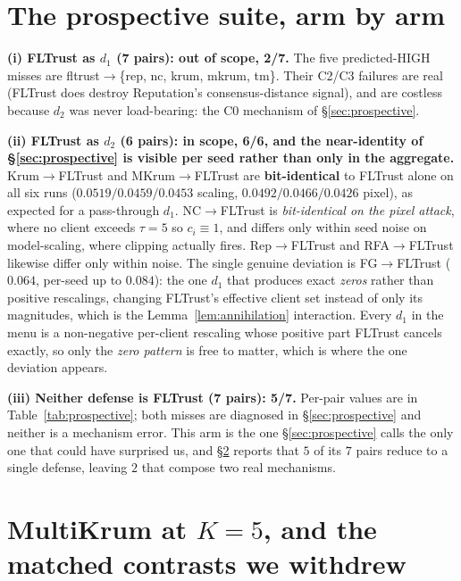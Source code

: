\documentclass{article}
\begin{document}
\small
\setlength{\tabcolsep}{4pt}

\section{The prospective suite, arm by arm}
\label{app:prospective_arms}

\textbf{(i) FLTrust as $d_1$ (7 pairs): out of scope, 2/7.} The five predicted-HIGH misses are fltrust$\to$\{rep, nc, krum, mkrum, tm\}. Their C2/C3 failures are real (FLTrust does destroy Reputation's consensus-distance signal), and are costless because $d_2$ was never load-bearing: the C0 mechanism of §\ref{sec:prospective}.

\textbf{(ii) FLTrust as $d_2$ (6 pairs): in scope, 6/6, and the near-identity of §\ref{sec:prospective} is visible per seed rather than only in the aggregate.} Krum$\to$FLTrust and MKrum$\to$FLTrust are \textbf{bit-identical} to FLTrust alone on all six runs ($0.0519/0.0459/0.0453$ scaling, $0.0492/0.0466/0.0426$ pixel), as expected for a pass-through $d_1$. NC$\to$FLTrust is \emph{bit-identical on the pixel attack}, where no client exceeds $\tau{=}5$ so $c_i \equiv 1$, and differs only within seed noise on model-scaling, where clipping actually fires. Rep$\to$FLTrust and RFA$\to$FLTrust likewise differ only within noise. The single genuine deviation is FG$\to$FLTrust ($0.064$, per-seed up to $0.084$): the one $d_1$ that produces exact \emph{zeros} rather than positive rescalings, changing FLTrust's effective client set instead of only its magnitudes, which is the Lemma~\ref{lem:annihilation} interaction. Every $d_1$ in the menu is a non-negative per-client rescaling whose positive part FLTrust cancels exactly, so only the \emph{zero pattern} is free to matter, which is where the one deviation appears.

\textbf{(iii) Neither defense is FLTrust (7 pairs): 5/7.} Per-pair values are in Table~\ref{tab:prospective}; both misses are diagnosed in §\ref{sec:prospective} and neither is a mechanism error. This arm is the one §\ref{sec:prospective} calls the only one that could have surprised us, and §\ref{app:mkrum} reports that $5$ of its $7$ pairs reduce to a single defense, leaving $2$ that compose two real mechanisms.

\section{MultiKrum at $K{=}5$, and the matched contrasts we withdrew}
\label{app:mkrum}
\end{document}
